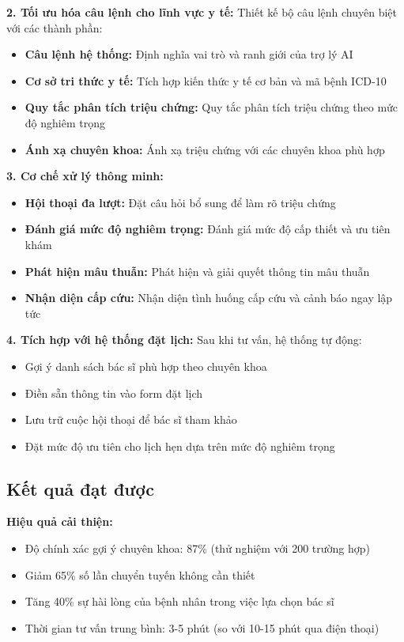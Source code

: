 \documentclass[../DoAn.tex]{subfiles}
\begin{document}
\textbf{2. Tối ưu hóa câu lệnh cho lĩnh vực y tế:}
Thiết kế bộ câu lệnh chuyên biệt với các thành phần:
\begin{itemize}
    \item \textbf{Câu lệnh hệ thống:} Định nghĩa vai trò và ranh giới của trợ lý AI
    \item \textbf{Cơ sở tri thức y tế:} Tích hợp kiến thức y tế cơ bản và mã bệnh ICD-10
    \item \textbf{Quy tắc phân tích triệu chứng:} Quy tắc phân tích triệu chứng theo mức độ nghiêm trọng
    \item \textbf{Ánh xạ chuyên khoa:} Ánh xạ triệu chứng với các chuyên khoa phù hợp
\end{itemize}

\textbf{3. Cơ chế xử lý thông minh:}
\begin{itemize}
    \item \textbf{Hội thoại đa lượt:} Đặt câu hỏi bổ sung để làm rõ triệu chứng
    \item \textbf{Đánh giá mức độ nghiêm trọng:} Đánh giá mức độ cấp thiết và ưu tiên khám
    \item \textbf{Phát hiện mâu thuẫn:} Phát hiện và giải quyết thông tin mâu thuẫn
    \item \textbf{Nhận diện cấp cứu:} Nhận diện tình huống cấp cứu và cảnh báo ngay lập tức
\end{itemize}

\textbf{4. Tích hợp với hệ thống đặt lịch:}
Sau khi tư vấn, hệ thống tự động:
\begin{itemize}
    \item Gợi ý danh sách bác sĩ phù hợp theo chuyên khoa
    \item Điền sẵn thông tin vào form đặt lịch
    \item Lưu trữ cuộc hội thoại để bác sĩ tham khảo
    \item Đặt mức độ ưu tiên cho lịch hẹn dựa trên mức độ nghiêm trọng
\end{itemize}

\subsection{Kết quả đạt được}

\textbf{Hiệu quả cải thiện:}
\begin{itemize}
    \item Độ chính xác gợi ý chuyên khoa: 87\% (thử nghiệm với 200 trường hợp)
    \item Giảm 65\% số lần chuyển tuyến không cần thiết
    \item Tăng 40\% sự hài lòng của bệnh nhân trong việc lựa chọn bác sĩ
    \item Thời gian tư vấn trung bình: 3-5 phút (so với 10-15 phút qua điện thoại)
\end{itemize}
\end{document}
